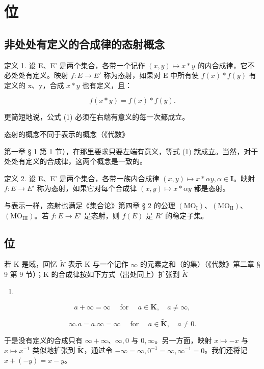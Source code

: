 \section{位}

\subsection{非处处有定义的合成律的态射概念}

定义 1. 设 E、E' 是两个集合，各带一个记作 \((x,y)\mapsto x*y\) 的内合成律，它不必处处有定义。映射 \(f:E\to E'\) 称为态射，如果对 E 中所有使 \(f(x)*f(y)\) 有定义的 x、y，合成 \(x*y\) 也有定义，且：

\[
f (x * y) = f (x) * f (y).\tag{1}
\]

更简短地说，公式 (1) 必须在右端有意义的每一次都成立。

态射的概念不同于表示的概念（《代数》

第一章 § 1 第 1 节），在那里要求只要左端有意义，等式 (1) 就成立。当然，对于处处有定义的合成律，这两个概念是一致的。

定义 2. 设 E、E' 是两个集合，各带一族内合成律 \((x,y)\mapsto x*\alpha y,\alpha\in\mathbf{I}\)。映射 \(f:E\to E'\) 称为态射，如果它对每个合成律 \((x,y)\mapsto x*\alpha y\) 都是态射。

与表示一样，态射也满足《集合论》第四章 § 2 的公理 \((\mathrm{MO}_{\mathrm{I}})\)、\((\mathrm{MO}_{\mathrm{II}})\)、\((\mathrm{MO}_{\mathrm{III}})\)。若 \(f: E \to E'\) 是态射，则 \(f(E)\) 是 \(R'\) 的稳定子集。

\subsection{位}

若 K 是域，回忆 \(\tilde{K}\) 表示 K 与一个记作 \(\infty\) 的元素之和（的集）（《代数》第二章 § 9 第 9 节）；K 的合成律按如下方式（出处同上）扩张到 \(\tilde{K}\)

\begin{enumerate}
\def\labelenumi{(\arabic{enumi})}
\setcounter{enumi}{1}
\tightlist
\item
\end{enumerate}

\[
a + \infty = \infty \quad \text { for } \quad a \in \mathbf {K}, \quad a \neq \infty ,\tag{2}
\]

\[
\infty . a = a. \infty = \infty \quad \text {   for   } \quad a \in \tilde {\mathbf {K}}, \quad a \neq 0.\tag{3}
\]

于是没有定义的合成只有 \(\infty + \infty\)、\(\infty, 0\) 与 \(0, \infty\)。另一方面，映射 \(x \mapsto -x\) 与 \(x \mapsto x^{-1}\) 类似地扩张到 \(\tilde{\mathbf{K}}\)，通过令 \(-\infty = \infty, 0^{-1} = \infty, \infty^{-1} = 0\)。我们还将记 \(x + (-y) = x - y\)。

